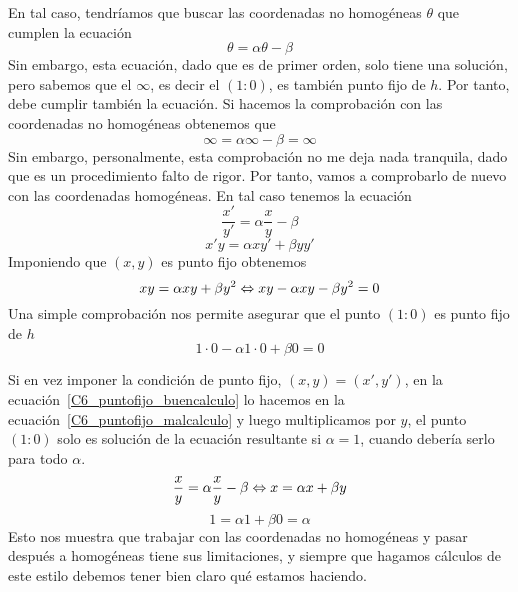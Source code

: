 En tal caso, tendríamos que buscar las coordenadas no homogéneas $\theta$ que cumplen la ecuación
\begin{equation*}
	\theta=\alpha\theta-\beta
\end{equation*}
Sin embargo, esta ecuación, dado que es de primer orden, solo tiene una solución, pero sabemos que el $\infty$, es decir el $(1:0)$, es también punto fijo de $h$. Por tanto, debe cumplir también la ecuación. Si hacemos la comprobación con las coordenadas no homogéneas obtenemos que 
\begin{equation*}
	\infty=\alpha\infty-\beta=\infty
\end{equation*}
Sin embargo, personalmente, esta comprobación no me deja nada tranquila, dado que es un procedimiento falto de rigor. Por tanto, vamos a comprobarlo de nuevo con las coordenadas homogéneas. En tal caso tenemos la ecuación
\begin{equation}
	\label{C6_puntofijo_malcalculo}
	\frac{x'}{y'}=\alpha\frac{x}{y}-\beta
\end{equation}
\begin{equation}
	\label{C6_puntofijo_buencalculo}
	x'y=\alpha xy'+\beta yy'
\end{equation}
Imponiendo que $(x,y)$ es punto fijo obtenemos 
\begin{equation*}
	 xy=\alpha xy+\beta y^2\Leftrightarrow xy-\alpha xy-\beta y^2=0
\end{equation*}
Una simple comprobación nos permite asegurar que el punto $(1:0)$ es punto fijo de $h$
\begin{equation*}
	1\cdot 0-\alpha 1\cdot 0+\beta0=0
\end{equation*}
\begin{obs}
	Si en vez imponer la condición de punto fijo, $(x,y)=(x',y')$, en la ecuación~\eqref{C6_puntofijo_buencalculo} lo hacemos en la ecuación~\eqref{C6_puntofijo_malcalculo} y luego multiplicamos por $y$, el punto $(1:0)$ solo es solución de la ecuación resultante si $\alpha=1$, cuando debería serlo para todo $\alpha$.
	\begin{equation*}
		\frac{x}{y}=\alpha\frac{x}{y}-\beta\Leftrightarrow x=\alpha x+\beta y
	\end{equation*}
	\begin{equation*}
		 1=\alpha 1+\beta 0=\alpha
	\end{equation*}
	Esto nos muestra que trabajar con las coordenadas no homogéneas y pasar después a homogéneas tiene sus limitaciones, y siempre que hagamos cálculos de este estilo debemos tener bien claro qué estamos haciendo.
\end{obs}

